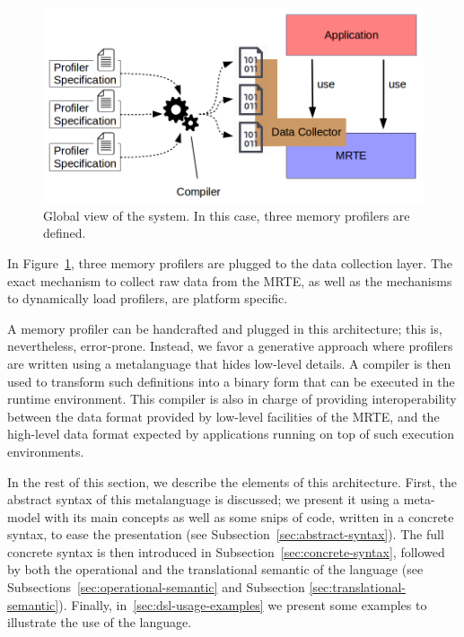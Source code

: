 \begin{figure}[!ht]
\centering
\includegraphics[scale=0.4]{./chapter6/fig/global-view.png}
\caption{Global view of the system. In this case, three memory profilers are defined.}\label{fig:dsl-global-view}
\end{figure}

In Figure~\ref{fig:dsl-global-view}, three memory profilers are plugged to the data collection layer.
The exact mechanism to collect raw data from the MRTE, as well as the mechanisms to dynamically load profilers, are platform specific.

A memory profiler can be handcrafted and plugged in this architecture; this is, nevertheless, error-prone.
Instead, we favor a generative approach where profilers are written using a metalanguage that hides low-level details.
A compiler is then used to transform such definitions into a binary form that can be executed in the runtime environment.
This compiler is also in charge of providing interoperability between the data format provided by low-level facilities of the MRTE, and the high-level data format expected by applications running on top of such execution environments. 

In the rest of this section, we describe the elements of this architecture.
First, the abstract syntax of this metalanguage is discussed; we present it using a meta-model with its main concepts as well as some snips of code, written in a concrete syntax, to ease the presentation (see Subsection~\ref{sec:abstract-syntax}).
The full concrete syntax is then introduced in Subsection~\ref{sec:concrete-syntax}, followed by 
\ifoperationalSemanticsOn
both the operational and
\else
the
\fi
translational semantic of the language (see 
\ifoperationalSemanticsOn
Subsections~\ref{sec:operational-semantic} and
\else
Subsection
\fi
\ref{sec:translational-semantic}).
Finally, in~\ref{sec:dsl-usage-examples} we present some examples to illustrate the use of the language.


